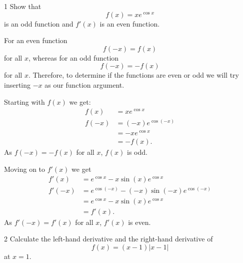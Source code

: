 \begin{problem}{1}
  Show that
  \begin{equation*}
    f(x) = x e^{\cos x}
  \end{equation*}
  is an odd function and $f'(x)$ is an even function.
\end{problem}

\begin{derivation}
  For an even function
  \begin{equation*}
    f(-x) = f(x) 
  \end{equation*}
  for all $x$, whereas for an odd function
  \begin{equation*}
    f(-x) = -f(x)
  \end{equation*}
  for all $x$.
  Therefore, to determine if the functions are even or odd we will try inserting $-x$ as our function argument.
  
  Starting with $f(x)$ we get:
  \begin{align*}
    f(x) &= x e^{\cos x} \\
    f(-x) &= (-x) e^{\cos (-x)} \\
    &= - x e^{\cos x} \\
    &= - f(x)
  .\end{align*}
  As $f(-x) = -f(x)$ for all $x$, $f(x)$ is odd.

  Moving on to $f'(x)$ we get
  \begin{align*}
    f'(x) &= e^{\cos x}-x \sin (x) e^{\cos x} \\
    f'(-x) &= e^{\cos (-x)} - (-x) \sin (-x) e^{\cos (-x)} \\
    &= e^{\cos x} - x \sin (x) e^{\cos x}\\
    &= f'(x)
  .\end{align*}
  As $f'(-x) = f'(x)$ for all $x$, $f'(x)$ is even.
\end{derivation}


\begin{problem}{2}
  Calculate the left-hand derivative and the right-hand derivative of
  \begin{equation*}
    f(x) = \left( x-1 \right) \left| x-1 \right|
  \end{equation*}
  at  $x = 1$.
\end{problem}

